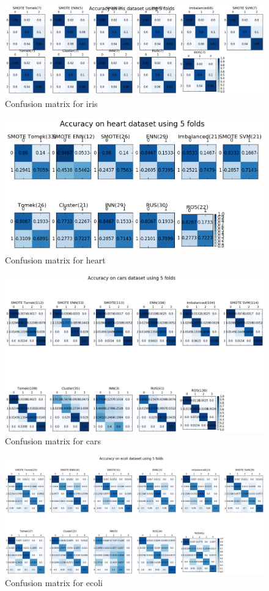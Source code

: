 \documentclass{article}
\begin{document}
			
			\begin{figure}\centering\includegraphics[width=\textwidth]{output/iris_balancing.png}\caption{Confusion matrix for iris}\end{figure}
			\begin{figure}\centering\includegraphics[width=\textwidth]{output/heart_balancing.png}\caption{Confusion matrix for heart}\end{figure}
			\begin{figure}\centering\includegraphics[width=\textwidth]{output/cars_balancing.png}\caption{Confusion matrix for cars}\end{figure}
			\begin{figure}\centering\includegraphics[width=\textwidth]{output/ecoli_balancing.png}\caption{Confusion matrix for ecoli}\end{figure}
\end{document}
